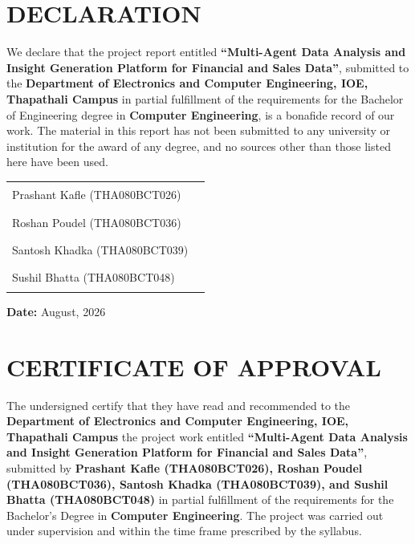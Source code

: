 \documentclass[12pt,a4paper,openany]{report}
\begin{document}
\chapter*{DECLARATION}

We declare that the project report entitled \textbf{``Multi-Agent Data Analysis and Insight Generation Platform for Financial and Sales Data''}, submitted to the \textbf{Department of Electronics and Computer Engineering, IOE, Thapathali Campus} in partial fulfillment of the requirements for the Bachelor of Engineering degree in \textbf{Computer Engineering}, is a bonafide record of our work. The material in this report has not been submitted to any university or institution for the award of any degree, and no sources other than those listed here have been used.

\vspace{2em}
\noindent\begin{tabular}{@{}p{}@{}p{}@{}}
Prashant Kafle (THA080BCT026) & \rule{5cm}{0.4pt} \\[1.2em]
Roshan Poudel (THA080BCT036) & \rule{5cm}{0.4pt} \\[1.2em]
Santosh Khadka (THA080BCT039) & \rule{5cm}{0.4pt} \\[1.2em]
Sushil Bhatta (THA080BCT048) & \rule{5cm}{0.4pt} \\
\end{tabular}

\vspace{1em}
\noindent \textbf{Date:} August, 2026

\clearpage

\chapter*{CERTIFICATE OF APPROVAL}

The undersigned certify that they have read and recommended to the \textbf{Department of Electronics and Computer Engineering, IOE, Thapathali Campus} the project work entitled \textbf{``Multi-Agent Data Analysis and Insight Generation Platform for Financial and Sales Data''}, submitted by \textbf{Prashant Kafle (THA080BCT026), Roshan Poudel (THA080BCT036), Santosh Khadka (THA080BCT039), and Sushil Bhatta (THA080BCT048)} in partial fulfillment of the requirements for the Bachelor's Degree in \textbf{Computer Engineering}. The project was carried out under supervision and within the time frame prescribed by the syllabus.
\end{document}
